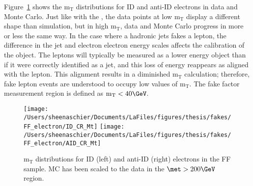 Figure~\ref{fig:elec_FF_mt} shows the $\mathrm{m_T}$ distributions for ID and anti-ID electrons in data and Monte Carlo.  Just like with the \met, the data points at low $\mathrm{m_T}$ display a different shape than simulation, but in high $\mathrm{m_T}$, data and Monte Carlo progress in more or less the same way.  In the case where a hadronic jets fakes a lepton, the difference in the jet and electron electron energy scales affects the calibration of the object.  The leptons will typically be measured as a lower energy object than if it were correctly identified as a jet, and this loss of energy reappears as \met aligned with the lepton.  This alignment results in a diminished $\mathrm{m_T}$ calculation; therefore, fake lepton events are understood to occupy low values of $\mathrm{m_T}$.  The fake factor measurement region is defined as $\mathrm{m_T} < 40\GeV$.
\begin{figure}[tbp]
  \centering
  \texttt{[image: /Users/sheenaschier/Documents/LaFiles/figures/thesis/fakes/FF\_electron/ID\_CR\_Mt]}
  \texttt{[image: /Users/sheenaschier/Documents/LaFiles/figures/thesis/fakes/FF\_electron/AID\_CR\_Mt]}
  \caption{$\mathrm{m_{T}}$ distributions for ID (left) and anti-ID (right) electrons in the FF sample.  MC has been scaled to the data in the $\met > 200\GeV$ region.}
  \label{fig:elec_FF_mt}
\end{figure}

